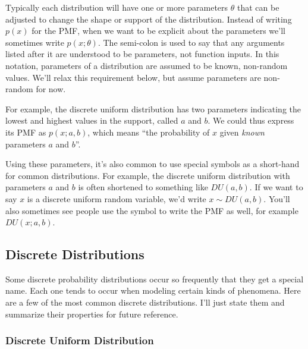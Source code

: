 \documentclass[
  letterpaper,
  DIV=11,
  numbers=noendperiod]{scrreprt}
\begin{document}
Typically each distribution will have one or more parameters \(\theta\)
that can be adjusted to change the shape or support of the distribution.
Instead of writing \(p(x)\) for the PMF, when we want to be explicit
about the parameters we'll sometimes write \(p(x; \theta)\). The
semi-colon is used to say that any arguments listed after it are
understood to be parameters, not function inputs. In this notation,
parameters of a distribution are assumed to be known, non-random values.
We'll relax this requirement below, but assume parameters are non-random
for now.

For example, the discrete uniform distribution has two parameters
indicating the lowest and highest values in the support, called \(a\)
and \(b\). We could thus express its PMF as \(p(x;a,b)\), which means
``the probability of \(x\) given \emph{known} parameters \(a\) and
\(b\)''.

Using these parameters, it's also common to use special symbols as a
short-hand for common distributions. For example, the discrete uniform
distribution with parameters \(a\) and \(b\) is often shortened to
something like \(DU(a,b)\). If we want to say \(x\) is a discrete
uniform random variable, we'd write \(x \sim DU(a,b)\). You'll also
sometimes see people use the symbol to write the PMF as well, for
example \(DU(x;a,b)\).

\hypertarget{discrete-distributions}{%
\subsection{Discrete Distributions}\label{discrete-distributions}}

Some discrete probability distributions occur so frequently that they
get a special name. Each one tends to occur when modeling certain kinds
of phenomena. Here are a few of the most common discrete distributions.
I'll just state them and summarize their properties for future
reference.

\hypertarget{discrete-uniform-distribution}{%
\subsubsection{Discrete Uniform
Distribution}\label{discrete-uniform-distribution}}
\end{document}
